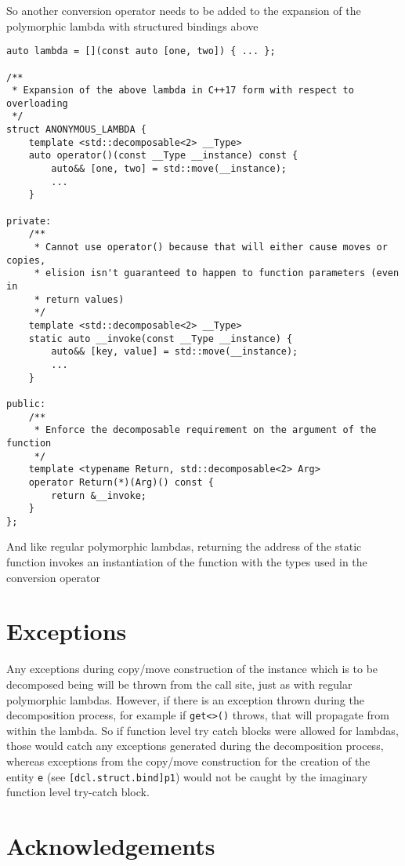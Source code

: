 \documentclass{article}
\begin{document}
So another conversion operator needs to be added to the expansion of the
polymorphic lambda with structured bindings above

\begin{lstlisting}
auto lambda = [](const auto [one, two]) { ... };

/**
 * Expansion of the above lambda in C++17 form with respect to overloading
 */
struct ANONYMOUS_LAMBDA {
    template <std::decomposable<2> __Type>
    auto operator()(const __Type __instance) const {
        auto&& [one, two] = std::move(__instance);
        ...
    }

private:
    /**
     * Cannot use operator() because that will either cause moves or copies,
     * elision isn't guaranteed to happen to function parameters (even in
     * return values)
     */
    template <std::decomposable<2> __Type>
    static auto __invoke(const __Type __instance) {
        auto&& [key, value] = std::move(__instance);
        ...
    }

public:
    /**
     * Enforce the decomposable requirement on the argument of the function
     */
    template <typename Return, std::decomposable<2> Arg>
    operator Return(*)(Arg)() const {
        return &__invoke;
    }
};
\end{lstlisting}

And like regular polymorphic lambdas, returning the address of the static
function invokes an instantiation of the function with the types used in the
conversion operator

\section{Exceptions}
Any exceptions during copy/move construction of the instance which is to be
decomposed being will be thrown from the call site, just as with regular
polymorphic lambdas.  However, if there is an exception thrown during the
decomposition process, for example if \texttt{get<>()} throws, that will
propagate from within the lambda.  So if function level try catch blocks were
allowed for lambdas, those would catch any exceptions generated during the
decomposition process, whereas exceptions from the copy/move construction for
the creation of the entity \texttt{e} (see \texttt{[dcl.struct.bind]p1}) would
not be caught by the imaginary function level try-catch block.


\section{Acknowledgements}
\end{document}
